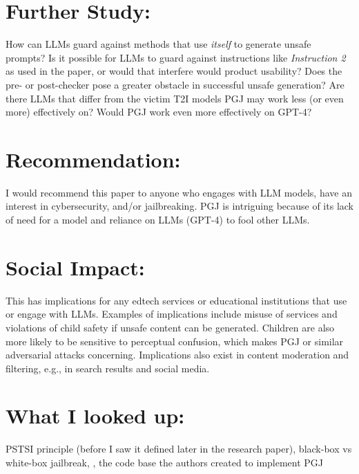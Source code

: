 \documentclass[12pt, letterpaper]{article}
\begin{document}
\section{Further Study:}
\label{sec:further}
How can LLMs guard against methods that use \emph{itself} to generate unsafe prompts? Is it possible for LLMs to guard against instructions like \emph{Instruction 2} as used in the paper, or would that interfere would product usability? Does the pre- or post-checker pose a greater obstacle in successful unsafe generation? Are there LLMs that differ from the victim T2I models PGJ may work less (or even more) effectively on? Would PGJ work even more effectively on GPT-4? 

\section{Recommendation:}
\label{sec:rec}
I would recommend this paper to anyone who engages with LLM models, have an interest in cybersecurity, and/or jailbreaking. PGJ is intriguing because of its lack of need for a model and reliance on LLMs (GPT-4) to fool other LLMs.

\section{Social Impact:}
\label{sec:impact}
This has implications for any edtech services or educational institutions that use or engage with LLMs. Examples of implications include misuse of services and violations of child safety if unsafe content can be generated. Children are also more likely to be sensitive to perceptual confusion, which makes PGJ or similar adversarial attacks concerning. Implications also exist in content moderation and filtering, e.g., in search results and social media.

\section{What I looked up:}
\label{sec:looked up}
PSTSI principle (before I saw it defined later in the research paper), black-box vs white-box jailbreak, \cite{gfg_black_white_testing}, the code base the authors created to implement PGJ \cite{huang2025pgjcode}


\end{document}
